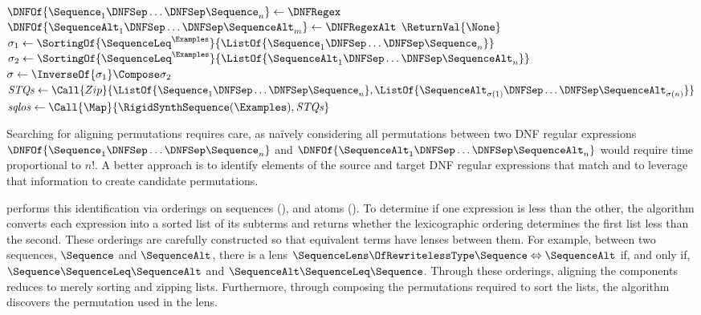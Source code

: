\documentclass[acmsmall,screen]{acmart}
\begin{document}
\begin{algorithm}
\begin{algorithmic}[1]
    \Statex

    \Function{\RigidSynth}{$\DNFRegex,\DNFRegexAlt,\Examples$}
    \State $\DNFOf{\Sequence_1 \DNFSep \ldots \DNFSep \Sequence_n} \gets
    \DNFRegex$
    \State $\DNFOf{\SequenceAlt_1 \DNFSep \ldots \DNFSep \SequenceAlt_m} \gets
    \DNFRegexAlt$
    \State $\ReturnVal{\None}$
    \EndIf
    \State $\sigma_1 \gets
    \SortingOf{\SequenceLeq^\Examples}{\ListOf{\Sequence_1 \DNFSep \ldots
        \DNFSep \Sequence_n}}$
    \State $\sigma_2 \gets
    \SortingOf{\SequenceLeq^\Examples}{\ListOf{\SequenceAlt_1 \DNFSep \ldots
        \DNFSep \SequenceAlt_n}}$
    \State $\sigma \gets \InverseOf{\sigma_1} \Compose \sigma_2$
    \State $\mathit{STQs} \gets
    \Call{Zip}{\ListOf{\Sequence_1 \DNFSep \ldots \DNFSep
        \Sequence_n},\ListOf{\SequenceAlt_{\sigma(1)} \DNFSep \ldots \DNFSep \SequenceAlt_{\sigma(n)}}}$
    \State $\mathit{sqlos} \gets
    \Call{\Map}{\RigidSynthSequence(\Examples),\mathit{STQs}}$
    \EndCaseTwo
    \CaseTwo {\None}{$\ReturnVal{\None}$}
    \EndCaseTwo
    \EndSwitch
    \EndFunction
  \end{algorithmic}
\end{algorithm}

Searching for aligning permutations requires care, as na\"{i}vely
considering all permutations between two DNF regular
expressions $\DNFOf{\Sequence_1 \DNFSep \ldots \DNFSep \Sequence_n}$ and
$\DNFOf{\SequenceAlt_1 \DNFSep \ldots \DNFSep \SequenceAlt_n}$ would require time
proportional to $n!$.  A better approach is to identify elements of
the source and target DNF regular expressions that match and to
leverage that information to create candidate permutations.

\RigidSynth{} performs this identification via orderings on
sequences (\SequenceLeq), and atoms (\AtomLeq).
To determine if one expression is less than the other, the algorithm converts
each expression into a sorted list of its subterms and returns whether the
lexicographic ordering determines the first list less than the second.
These orderings are carefully constructed so that equivalent terms have lenses
between them.  For
example, between two sequences, $\Sequence$ and $\SequenceAlt$, there is a lens
$\SequenceLens \OfRewritelessType \Sequence \Leftrightarrow \SequenceAlt$ if,
and only if, $\Sequence \SequenceLeq \SequenceAlt$ and $\SequenceAlt
\SequenceLeq \Sequence$.  Through these orderings, aligning the components
reduces to merely sorting and zipping lists.  Furthermore, through composing the
permutations required to sort the lists, the algorithm discovers the
permutation used in the lens.
\end{document}
